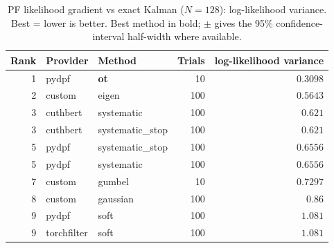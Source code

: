 \begin{table}[!htbp]
\centering
\small
\caption{PF likelihood gradient vs exact Kalman ($N=128$): log-likelihood variance. Best = lower is better. Best method in bold; $\pm$ gives the 95\% confidence-interval half-width where available.}
\label{tab:pf-likelihood-gradient-vs-exact-kalman-loglik-variance}
\begin{tabular}{rllrr}
\toprule
Rank & Provider & Method & Trials & log-likelihood variance \\
\midrule
1 & pydpf & \textbf{ot} & 10 & $\mathbf{0.3098}$ \\
2 & custom & eigen & 100 & $0.5643$ \\
3 & cuthbert & systematic & 100 & $0.621$ \\
3 & cuthbert & systematic\_stop & 100 & $0.621$ \\
5 & pydpf & systematic\_stop & 100 & $0.6556$ \\
5 & pydpf & systematic & 100 & $0.6556$ \\
7 & custom & gumbel & 10 & $0.7297$ \\
8 & custom & gaussian & 100 & $0.86$ \\
9 & pydpf & soft & 100 & $1.081$ \\
9 & torchfilter & soft & 100 & $1.081$ \\
\bottomrule
\end{tabular}
\end{table}
